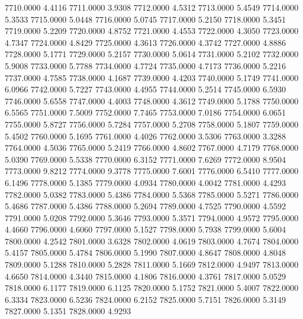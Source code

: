 7710.0000      4.4116
7711.0000      3.9308
7712.0000      4.5312
7713.0000      5.4549
7714.0000      5.3533
7715.0000      5.0448
7716.0000      5.0745
7717.0000      5.2150
7718.0000      5.3451
7719.0000      5.2209
7720.0000      4.8752
7721.0000      4.4553
7722.0000      4.3050
7723.0000      4.7347
7724.0000      4.8429
7725.0000      4.3613
7726.0000      4.3742
7727.0000      4.8886
7728.0000      5.1771
7729.0000      5.2157
7730.0000      5.0614
7731.0000      5.2102
7732.0000      5.9008
7733.0000      5.7788
7734.0000      4.7724
7735.0000      4.7173
7736.0000      5.2216
7737.0000      4.7585
7738.0000      4.1687
7739.0000      4.4203
7740.0000      5.1749
7741.0000      6.0966
7742.0000      5.7227
7743.0000      4.4955
7744.0000      5.2514
7745.0000      6.5930
7746.0000      5.6558
7747.0000      4.4003
7748.0000      4.3612
7749.0000      5.1788
7750.0000      6.5565
7751.0000      7.5009
7752.0000      7.7465
7753.0000      7.0186
7754.0000      6.0651
7755.0000      5.8727
7756.0000      5.7284
7757.0000      5.2708
7758.0000      5.1807
7759.0000      5.4502
7760.0000      5.1695
7761.0000      4.4026
7762.0000      3.5306
7763.0000      3.3288
7764.0000      4.5036
7765.0000      5.2419
7766.0000      4.8602
7767.0000      4.7179
7768.0000      5.0390
7769.0000      5.5338
7770.0000      6.3152
7771.0000      7.6269
7772.0000      8.9504
7773.0000      9.8212
7774.0000      9.3778
7775.0000      7.6001
7776.0000      6.5410
7777.0000      6.1496
7778.0000      5.1385
7779.0000      4.0934
7780.0000      4.0042
7781.0000      4.4293
7782.0000      5.0382
7783.0000      5.4386
7784.0000      5.5368
7785.0000      5.5271
7786.0000      5.4686
7787.0000      5.4386
7788.0000      5.2694
7789.0000      4.7525
7790.0000      4.5592
7791.0000      5.0208
7792.0000      5.3646
7793.0000      5.3571
7794.0000      4.9572
7795.0000      4.4660
7796.0000      4.6060
7797.0000      5.1527
7798.0000      5.7938
7799.0000      5.6004
7800.0000      4.2542
7801.0000      3.6328
7802.0000      4.0619
7803.0000      4.7674
7804.0000      5.4157
7805.0000      5.4784
7806.0000      5.1990
7807.0000      4.8647
7808.0000      4.8048
7809.0000      5.1288
7810.0000      5.2828
7811.0000      5.1669
7812.0000      4.9497
7813.0000      4.6650
7814.0000      4.3440
7815.0000      4.1806
7816.0000      4.3761
7817.0000      5.0529
7818.0000      6.1177
7819.0000      6.1125
7820.0000      5.1752
7821.0000      5.4007
7822.0000      6.3334
7823.0000      6.5236
7824.0000      6.2152
7825.0000      5.7151
7826.0000      5.3149
7827.0000      5.1351
7828.0000      4.9293
